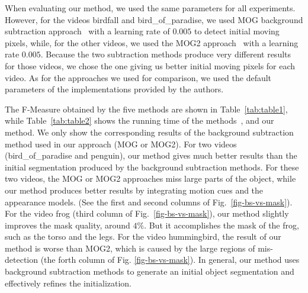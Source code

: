 When evaluating our method, we used the same parameters for all experiments. However, for the videos birdfall and bird\_of\_paradise, we used MOG background subtraction approach~\cite{kaewtrakulpong2002} with a learning rate of $0.005$ to detect initial moving pixels, while, for the other videos, we used the MOG2 approach~\cite{zivkovic2004} with a learning rate $0.005$. Because the two subtraction methods produce very different results for those videos, we chose the one giving us better initial moving pixels for each video.
As for the approaches we used for comparison, we used the default parameters of the implementations provided by the authors.

The F-Measure obtained by the five methods are shown in Table~\ref{tab:table1}, while Table~\ref{tab:table2} shows the running time of the methods~\cite{papazoglou2013}, \cite{zhang2013} and our method.
We only show the corresponding results of the background subtraction method used in our approach (MOG or MOG2).
For two videos (bird\_of\_paradise and penguin), our method gives much better results than the initial segmentation produced by the background subtraction methods. For these two videos, the MOG or MOG2 approaches miss large parts of the object, while our method produces better results by integrating motion cues and the appearance models. (See the first and second columns of Fig.~\ref{fig-bs-vs-mask}).
For the video frog (third column of Fig.~\ref{fig-bs-vs-mask}), our method slightly improves the mask quality, around $4\%$. But it accomplishes the mask of the frog, such as the torso and the legs.
For the video hummingbird, the result of our method is worse than MOG2, which is caused by the large regions of mis-detection (the forth column of Fig. \ref{fig-bs-vs-mask}).
In general, our method uses background subtraction methods to generate an initial object segmentation and effectively refines the initialization.


